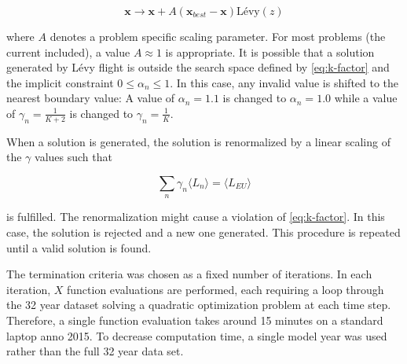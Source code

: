 \documentclass[a4paper, 5p, sort&compress]{elsarticle}%
\newcommand{\paren}[1]{\left(#1\right)}
\begin{document}
\begin{equation}
  \label{eq:1}
  \boldsymbol x \to \boldsymbol x + A \paren{\boldsymbol x_{best}- \boldsymbol x} \mbox{Lévy}(z) 
\end{equation}

where $A$ denotes a problem specific scaling parameter. For most
problems (the current included), a value $A \approx 1$ is appropriate. It is
possible that a solution generated by Lévy flight is outside the
search space defined by \cref{eq:k-factor} and the implicit constraint
$0 \leq \alpha_{n} \leq 1$. In this case, any invalid value is shifted to
the nearest boundary value: A value of $\alpha_{n} = 1.1$ is changed to
$\alpha_{n} = 1.0$ while a value of $\gamma_{n} = \frac{1}{K+2}$ is changed to
$\gamma_{n} = \frac{1}{K}$.

% 
% 

When a solution is generated, the solution is renormalized by a linear
scaling of the $\gamma$ values such that

\begin{equation}
  \label{eq:10}
  \sum_{n} \gamma_{n} \langle L_{n} \rangle = \langle L_{EU} \rangle
\end{equation}

is fulfilled. The renormalization might cause a violation of
\cref{eq:k-factor}. In this case, the solution is rejected and a
new one generated. This procedure is repeated until a valid solution
is found.

The termination criteria was chosen as a fixed number of
iterations. In each iteration, $X$ function evaluations are performed,
each requiring a loop through the 32 year dataset solving a quadratic
optimization problem at each time step. Therefore, a single function
evaluation takes around 15 minutes on a standard laptop anno 2015. To
decrease computation time, a single model year was used rather than
the full 32 year data set.
\end{document}
